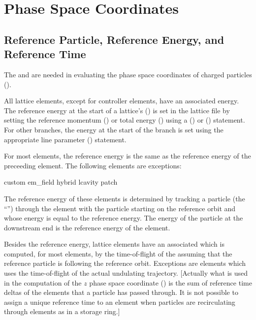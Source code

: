 \section{Phase Space Coordinates}
\label{s:phase.coords}

\subsection{Reference Particle, Reference Energy, and Reference Time}
\label{s:ref.energy}

The  and  are needed in
evaluating the phase space coordinates of charged particles
().  

All lattice elements, except for controller elements, have an
associated  energy.  The reference energy at the
start of a lattice's  () is set in
the lattice file by setting the reference momentum () or total
energy () using a  () or
 () statement. For other branches, the
energy at the start of the branch is set using the appropriate line
parameter () statement.

For most elements, the reference energy is the same as the reference
energy of the preceeding element. The following elements are
exceptions:
\begin{example}
  custom
  em_field
  hybrid
  lcavity
  patch
\end{example}
The reference energy of these elements is determined by tracking a
particle (the ``'') through the element with the
particle starting on the reference orbit and whose energy is equal to
the reference energy.  The energy of the particle at the downstream
end is the reference energy of the element.

Besides the reference energy, lattice elements have an associated
 which is computed, for most elements, by the
time-of-flight of the  assuming that the
reference particle is following the reference orbit. Exceptions are
 elements which uses the time-of-flight of the actual
undulating trajectory. [Actually what is used in the computation of the
$z$ phase space coordinate () is the sum of reference time
deltas of the elements that a particle has passed through. It is not
possible to assign a unique reference time to an element when particles
are recirculating through elements as in a storage ring.]

